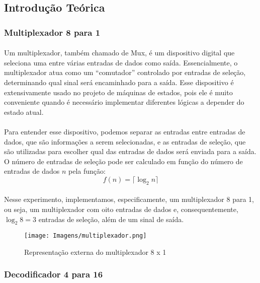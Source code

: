\documentclass[a4paper,12pt]{article}
\begin{document}
\subsection{Introdução Teórica}

\subsubsection{Multiplexador 8 para 1}
\paragraph{}
Um multiplexador, também chamado de Mux, é um dispositivo digital que seleciona uma entre várias entradas de dados como saída. Essencialmente, o multiplexador atua como um ``comutador'' controlado por entradas de seleção, determinando qual sinal será encaminhado para a saída. Esse dispositivo é extensivamente usado no projeto de máquinas de estados, pois ele é muito conveniente quando é necessário implementar diferentes lógicas a depender do estado atual.

\paragraph{}
Para entender esse dispositivo, podemos separar as entradas entre entradas de dados, que são informações a serem selecionadas, e as entradas de seleção, que são utilizadas para escolher qual das entradas de dados será enviada para a saída. O número de entradas de seleção pode ser calculado em função do número de entradas de dados $n$ pela função:
\[
f(n) = \lceil \log_2n \rceil
\]

\paragraph{}
Nesse experimento, implementamos, especificamente, um multiplexador 8 para 1, ou seja, um multiplexador com oito entradas de dados e, consequentemente, $\log_2 8 = 3$ entradas de seleção, além de um sinal de saída.

\begin{figure}[H]
    \centering
    \texttt{[image: Imagens/multiplexador.png]}
    \caption{Representação externa do multiplexador 8 x 1}
    \label{fig:Mux_externa}
\end{figure}

\subsubsection{Decodificador 4 para 16}
\end{document}
